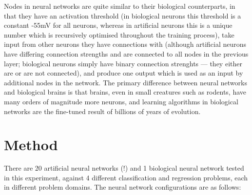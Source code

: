 \documentclass[]{report}
\begin{document}
Nodes in neural networks are quite similar to their biological counterparts, in that they have an activation threshold (in biological neurons this threshold is a constant -55mV for all neurons, whereas in artificial neurons this is a unique number which is recursively optimised throughout the training process), take input from other neurons they have connections with (although artificial neurons have differing connection strengths and are connected to all nodes in the previous layer; biological neurons simply have binary connection strenghts --- they either are or are not connected), and produce one output which is used as an input by additional nodes in the network. The primary difference between neural networks and biological brains is that brains, even in small creatures such as rodents, have many orders of magnitude more neurons, and learning algorithms in biological networks are the fine-tuned result of billions of years of evolution.

\label{itm:Method}
\section{Method}

There are 20 artificial neural networks (!) and 1 biological neural network tested in this experiment, against 4 different classification and regression problems, each in different problem domains. The neural network configurations are as follows:
\end{document}
